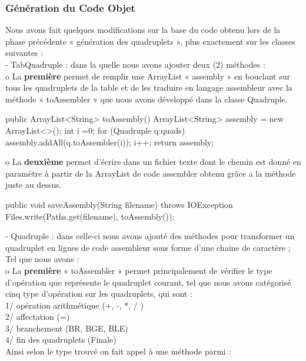 \documentclass[12pt]{article}
\begin{document}
\subsubsection{Génération du Code Objet}

Nous avons fait quelques modifications sur la base du code obtenu lors de la phase précédente « génération des quadruplets », plus exactement sur les classes suivantes :\\

\color{blue}
-	TabQuadruple : \color{black} dans la quelle nous avons ajouter deux (2) méthodes :\\

o	La \textbf{première} permet de remplir une ArrayList « assembly » en bouclant sur tous les quadruplets de la table et de les traduire en langage assembleur avec la méthode « toAssembler » que nous avons développé dans la classe Quadruple.\\

\begin{sql}
    public ArrayList<String> toAssembly() {
        ArrayList<String> assembly = new ArrayList<>();
        int i =0;
        for (Quadruple q:quads){
            assembly.addAll(q.toAssembler(i));
            i++;
        }
        return assembly;
    }
\end{sql}

o	La \textbf{deuxième} permet d'écrire dans un fichier texte dont le chemin est donné en paramètre à partir de la ArrayList de code assembler obtenu grâce a la méthode juste au dessus.

\begin{sql}

    public void saveAssembly(String filename) throws IOException {
        Files.write(Paths.get(filename), toAssembly());
    }
\end{sql}

\color{blue}
-	Quadruple : \color{black} dans celle-ci nous avons ajouté des méthodes pour transformer un quadruplet en lignes de code assembleur sous forme d'une chaine de caractère ;
Tel que nous avons :\\

o	La \textbf{première} « toAssembler » permet principalement de vérifier le type d'opération que représente le quadruplet courant, tel que nous avons catégorisé cinq type d'opération sur les quadruplets, qui sont :\\
1/ opération arithmétique (+, -, *, / )\\
2/ affectation (=)\\
3/ branchement (BR, BGE, BLE)\\
4/ fin des quadruplets (Finale)\\
		Ainsi selon le type trouvé on fait appel à une méthode parmi :\\
		
\end{document}

